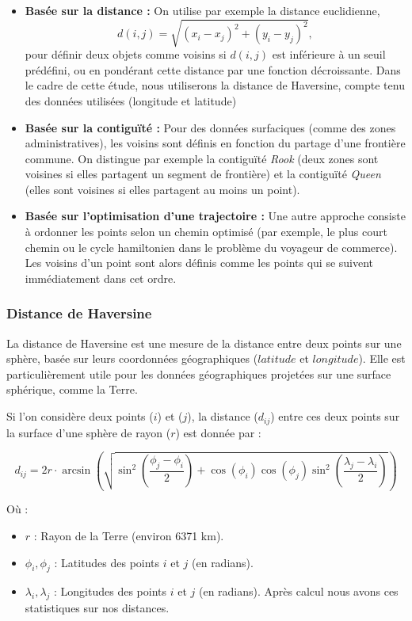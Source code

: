 \documentclass[
]{article}
\begin{document}
\begin{itemize}
  \item \textbf{Basée sur la distance :}  
  On utilise par exemple la distance euclidienne,
  $$
  d(i,j) = \sqrt{(x_i - x_j)^2 + (y_i - y_j)^2},
  $$
pour définir deux objets comme voisins si \(d(i,j)\) est inférieure à un seuil prédéfini, ou en pondérant cette distance par une fonction décroissante. Dans le cadre de cette étude, nous utiliserons la distance de Haversine, compte tenu des données utilisées (longitude et latitude)

\item \textbf{Basée sur la contiguïté :}  
  Pour des données surfaciques (comme des zones administratives), les voisins sont définis en fonction du partage d'une frontière commune. On distingue par exemple la contiguïté \emph{Rook} (deux zones sont voisines si elles partagent un segment de frontière) et la contiguïté \emph{Queen} (elles sont voisines si elles partagent au moins un point).
  
  \item \textbf{Basée sur l'optimisation d'une trajectoire :}  
  Une autre approche consiste à ordonner les points selon un chemin optimisé (par exemple, le plus court chemin ou le cycle hamiltonien dans le problème du voyageur de commerce). Les voisins d'un point sont alors définis comme les points qui se suivent immédiatement dans cet ordre.
\end{itemize}

\subsubsection{Distance de Haversine}\label{distance-de-haversine}

La distance de Haversine est une mesure de la distance entre deux points
sur une sphère, basée sur leurs coordonnées géographiques (\(latitude\)
et \(longitude\)). Elle est particulièrement utile pour les données
géographiques projetées sur une surface sphérique, comme la Terre.

Si l'on considère deux points (\(i\)) et (\(j\)), la distance
(\(d_{ij}\)) entre ces deux points sur la surface d'une sphère de rayon
(\(r\)) est donnée par :

\[
 d_{ij} = 2r \cdot \arcsin\left(\sqrt{\sin^2\left(\frac{\phi_j - \phi_i}{2}\right) + \cos(\phi_i)\cos(\phi_j)\sin^2\left(\frac{\lambda_j - \lambda_i}{2}\right)}\right)
\]

Où :

\begin{itemize}
\item
  \(r\) : Rayon de la Terre (environ 6371 km).
\item
  \(\phi_i, \phi_j\) : Latitudes des points \(i\) et \(j\) (en radians).
\item
  \(\lambda_i, \lambda_j\) : Longitudes des points \(i\) et \(j\) (en
  radians). Après calcul nous avons ces statistiques sur nos distances.
\end{itemize}
\end{document}
